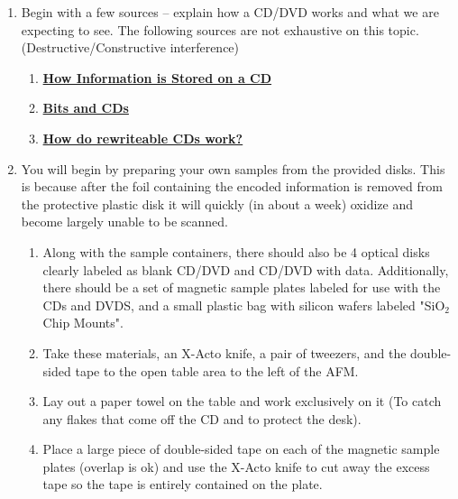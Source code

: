 \documentclass{../lab}
\begin{document}
\begin{enumerate}
    \item Begin with a few sources -- explain how a CD/DVD works and what we are expecting to see. The following sources are not exhaustive on this topic. (Destructive/Constructive interference)

    \begin{enumerate}

        \item \href{http://experimentationlab.berkeley.edu/sites/default/files/How\%20Information\%20is\%20Stored\%20on\%20a\%20CD.mp4}{\textbf{How Information is Stored on a CD}}

        \item \href{http://experimentationlab.berkeley.edu/sites/default/files/Bits_and_CDs.pdf}{\textbf{Bits and CDs}}

        \item \href{http://experimentationlab.berkeley.edu/sites/default/files/How_do_Rewriteable_CDs_work.pdf}{\textbf{How do rewriteable CDs work?}}

    \end{enumerate}
    
    \item You will begin by preparing your own samples from the provided disks. This is because after the foil containing the encoded information is removed from the protective plastic disk it will quickly (in about a week) oxidize and become largely unable to be scanned. 
    
    \begin{enumerate}
    
    \item Along with the sample containers, there should also be 4 optical disks clearly labeled as blank CD/DVD and CD/DVD with data. Additionally, there should be a set of magnetic sample plates labeled for use with the CDs and DVDS, and a small plastic bag with silicon wafers labeled "SiO$_2$ Chip Mounts".
    
    \item Take these materials, an X-Acto knife, a pair of tweezers, and the double-sided tape to the open table area to the left of the AFM.
    
    \item Lay out a paper towel on the table and work exclusively on it (To catch any flakes that come off the CD and to protect the desk). 
    
    \item Place a large piece of double-sided tape on each of the magnetic sample plates (overlap is ok) and use the X-Acto knife to cut away the excess tape so the tape is entirely contained on the plate. 
    

\end{enumerate}
\end{enumerate}
\end{document}

